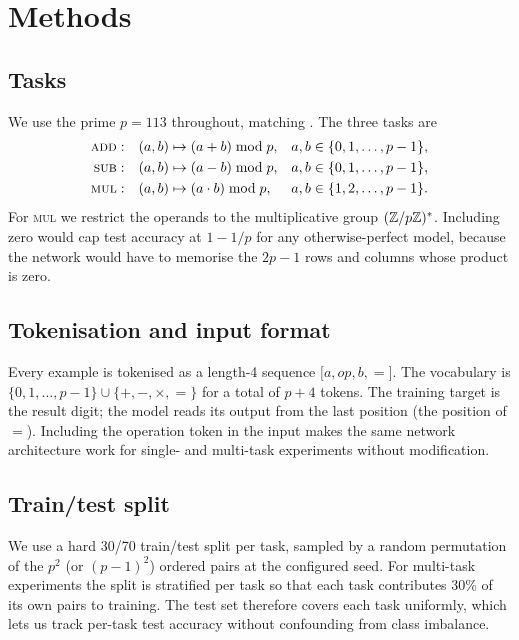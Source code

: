 \section{Methods}
\label{sec:methods}

\subsection{Tasks}

We use the prime $p = 113$ throughout, matching \citet{nanda2023progress}.
The three tasks are
\begin{align*}
\textsc{add}: \quad & (a, b) \mapsto (a + b) \bmod p,
                      & a, b &\in \{0, 1, \ldots, p - 1\}, \\
\textsc{sub}: \quad & (a, b) \mapsto (a - b) \bmod p,
                      & a, b &\in \{0, 1, \ldots, p - 1\}, \\
\textsc{mul}: \quad & (a, b) \mapsto (a \cdot b) \bmod p,
                      & a, b &\in \{1, 2, \ldots, p - 1\}.
\end{align*}
For \textsc{mul} we restrict the operands to the multiplicative group
$(\mathbb{Z}/p\mathbb{Z})^*$. Including zero would cap test accuracy at $1 - 1/p$ for any
otherwise-perfect model, because the network would have to memorise the
$2p - 1$ rows and columns whose product is zero.

\subsection{Tokenisation and input format}

Every example is tokenised as a length-4 sequence
$\bigl[ a, \mathit{op}, b, = \bigr]$. The vocabulary is
$\{0, 1, \ldots, p - 1\} \cup \{+, -, \times, =\}$ for a total of $p + 4$
tokens. The training target is the result digit; the model reads its
output from the last position (the position of $=$). Including the
operation token in the input makes the same network architecture work for
single- and multi-task experiments without modification.

\subsection{Train/test split}

We use a hard 30/70 train/test split per task, sampled by a random
permutation of the $p^2$ (or $(p - 1)^2$) ordered pairs at the configured
seed. For multi-task experiments the split is stratified per task so that
each task contributes 30\% of its own pairs to training. The test set
therefore covers each task uniformly, which lets us track per-task test
accuracy without confounding from class imbalance.

